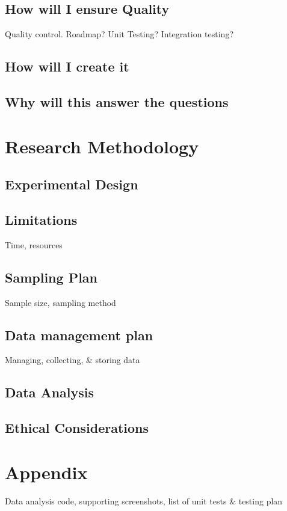\documentclass[lettersize,journal]{IEEEtran}
\begin{document}
    \subsection{How will I ensure Quality}
        Quality control. Roadmap? Unit Testing? Integration testing?

    \subsection{How will I create it}

    \subsection{Why will this answer the questions}

\section{Research Methodology}
    \subsection{Experimental Design}

    \subsection{Limitations}
        Time, resources

    \subsection{Sampling Plan}
        Sample size, sampling method

    \subsection{Data management plan}
        Managing, collecting, \& storing data

    \subsection{Data Analysis}

    \subsection{Ethical Considerations}

\section{Appendix}
    Data analysis code, supporting screenshots, list of unit tests \& testing plan \cite{steamVid}



\end{document}
